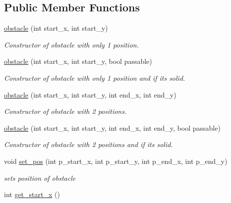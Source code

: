 \subsection*{Public Member Functions}
\begin{DoxyCompactItemize}
\item 
\hyperlink{classobstacle_ac5d3684c209786d12571f8ad09445ffc}{obstacle} (int start\+\_\+x, int start\+\_\+y)
\begin{DoxyCompactList}\small\item\em Constructor of obstacle with only 1 position. \end{DoxyCompactList}\item 
\hyperlink{classobstacle_af3e8b2149760b57bb9238f03bd1616b7}{obstacle} (int start\+\_\+x, int start\+\_\+y, bool passable)
\begin{DoxyCompactList}\small\item\em Constructor of obstacle with only 1 position and if it\textquotesingle{}s solid. \end{DoxyCompactList}\item 
\hyperlink{classobstacle_a39b2e95776adad7254a2fbe0239364a0}{obstacle} (int start\+\_\+x, int start\+\_\+y, int end\+\_\+x, int end\+\_\+y)
\begin{DoxyCompactList}\small\item\em Constructor of obstacle with 2 positions. \end{DoxyCompactList}\item 
\hyperlink{classobstacle_a94dfef60582ffd9f6b08012d61bc4ad3}{obstacle} (int start\+\_\+x, int start\+\_\+y, int end\+\_\+x, int end\+\_\+y, bool passable)
\begin{DoxyCompactList}\small\item\em Constructor of obstacle with 2 positions and if it\textquotesingle{}s solid. \end{DoxyCompactList}\item 
void \hyperlink{classobstacle_af6a9bc32f4999fd9109eda04febdae40}{set\+\_\+pos} (int p\+\_\+start\+\_\+x, int p\+\_\+start\+\_\+y, int p\+\_\+end\+\_\+x, int p\+\_\+end\+\_\+y)
\begin{DoxyCompactList}\small\item\em sets position of obstacle \end{DoxyCompactList}\item 
\mbox{\label{classobstacle_a497febf8720e8db38f0d4b385feb192d}} 
int \hyperlink{classobstacle_a497febf8720e8db38f0d4b385feb192d}{get\+\_\+start\+\_\+x} ()

\end{DoxyCompactItemize}
